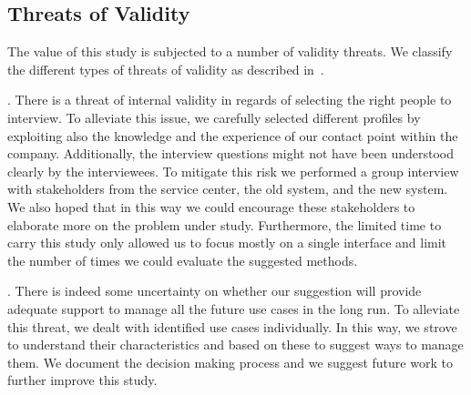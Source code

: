 \subsection{Threats of Validity}\label{sec:discussion}


The value of this study is subjected to a number of validity threats. We classify the different types of threats of validity as described in~\cite{Wohlin2000}. %

. %
There is a threat of internal validity in regards of selecting the right people to interview. To alleviate this issue, we carefully selected different profiles by exploiting also the knowledge and the experience of our contact point within the company. %
Additionally, the interview questions might not have been understood clearly by the interviewees. To mitigate this risk we performed a group interview with stakeholders from the service center, the old system, and the new system. We also hoped that in this way we could encourage these stakeholders to elaborate more on the problem under study. Furthermore, the limited time to carry this study only allowed us to focus mostly on a single interface and limit the number of times we could evaluate the suggested methods. 


. %
There is indeed some uncertainty on whether our suggestion will provide adequate support to manage all the future use cases in the long run. To alleviate this threat, we dealt with identified use cases individually. In this way, we strove to understand their characteristics and based on these to suggest ways to manage them. We document the decision making process and we suggest future work to further improve this study.

